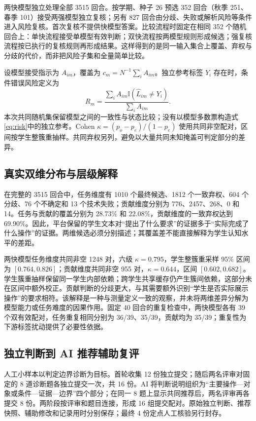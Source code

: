 \documentclass[withoutpreface,bwprint]{cumcmthesis}
\newcommand{\ind}{\mathbb{I}}
\begin{document}
两快模型独立处理全部 3515 回合。按学期、种子 26 预选 352 回合（秋季 251、春季 101）接受两强模型独立复核；另有 827 回合由分歧、失败或解析风险等条件进入风险复核。首次复核不提供快模型答案。比较流程时固定在相同 352 个随机回合上：单快流程接受单模型有效判断；双快流程按两模型规则形成候选；强复核流程按已执行的复核规则再形成结果。这样得到的是同一输入集合上覆盖、弃权与分歧的代价，而非把风险子集和全量简单比较。

设模型接受指示为 $A_{im}$，覆盖为 $c_m=N^{-1}\sum_iA_{im}$。独立参考标签 $Y_i$ 存在时，条件错误风险定义为
\begin{equation}\label{eq:risk}
R_m=\frac{\sum_i A_{im}\ind(\widehat L_{im}\ne Y_i)}{\sum_i A_{im}}.
\end{equation}
本次共同随机集保留模型之间的一致性与状态比较；没有以模型多数票构造式\eqref{eq:risk}中的独立参考。Cohen $\kappa=(p_o-p_e)/(1-p_e)$ 使用共同非空配对，区间按学生整簇重抽样。共同弃权另列，避免以大量共同未知掩盖可判定部分的差异。

\FinalWorkflowResults{}

\subsection{真实双维分布与层级解释}
在完整的 3515 回合中，任务维度有 1010 个最终候选、1812 个一致弃权、604 个分歧、76 个不确定和 13 个技术失败；贡献维度分别为 776、2457、268、0 和 14。任务与贡献的覆盖分别为 28.73\% 和 22.08\%，贡献维度的一致弃权达到 69.90\%。因此，平台保留的学生文本对“提出了什么要求”的证据多于“实际完成了什么操作”的证据。两维候选必须分别描述；其覆盖差不能直接解释为学生认知水平的差距。

\FinalDistributionResults{}

两快模型任务维度共同非空 1248 对，六级 $\kappa=0.795$，学生整簇重采样 95\% 区间为 $[0.764,0.826]$；贡献维度共同非空 955 对，$\kappa=0.644$，区间 $[0.602,0.682]$。学生簇重抽样保留同一学生内部依赖；跨学生共享缓存仍产生簇间依赖，这部分未在区间中额外校正。贡献判断的分歧更大，与其需要额外识别“学生是否实际展示操作”的要求相符。该解释是一种与测量定义一致的观察，并未将两维差异分解为模型能力或任务难度的因果作用。固定 40 回合的重复检查中，两快模型各有 39 个双有效配对，任务重复相同分别为 36/39、35/39，贡献均为 35/39；重复性为下游标签扰动提供了必要性依据。

\subsection{独立判断到 AI 推荐辅助复评}
人工小样本以判定边界诊断为目标。首轮收集 12 份独立提交；随后两名评审对固定的 8 道诊断题各独立提交一次，共 16 份。AI 将判断说明组织为“主要操作—对象或条件—证据—边界”四个部分；在同一 8 题上显示共同推荐后，两名评审再各提交 8 份。两阶段按评审和题目连接，形成 16 组提交配对。原始独立判断、推荐快照、辅助修改和记录用时分别保存；最终 4 份定点人工核验另行封存。
\end{document}
